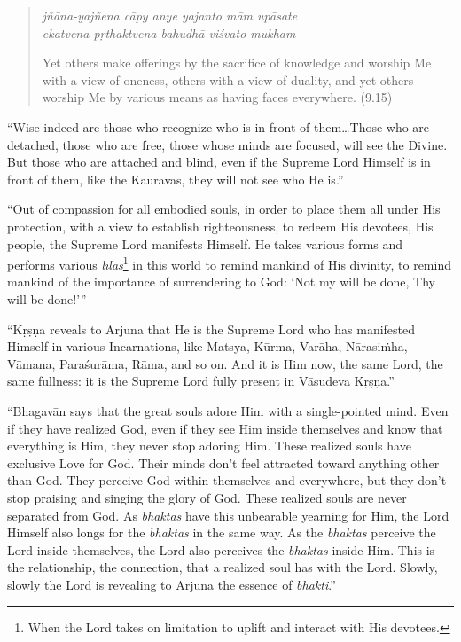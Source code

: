 \documentclass[12pt, twoside, openright]{memoir}
\begin{document}
\par
\begin{verse}
\textit{jñāna-yajñena cāpy anye yajanto mām upāsate} \\
\textit{ekatvena pṛthaktvena bahudhā viśvato-mukham}

\noindent Yet others make offerings by the sacrifice of knowledge and worship Me with a view of oneness, others with a view of duality, and yet others worship Me by various means as having faces everywhere. (9.15)
\end{verse}
\par


\enquote{Wise indeed are those who recognize who is in front of them\ldots Those who are detached, those who are free, those whose minds are focused, will see the Divine. But those who are attached and blind, even if the Supreme Lord Himself is in front of them, like the Kauravas, they will not see who He is.}

\enquote{Out of compassion for all embodied souls, in order to place them all under His protection, with a view to establish righteousness, to redeem His devotees, His people, the Supreme Lord manifests Himself. He takes various forms and performs various \textit{līlās}\footnote{When the Lord takes on limitation to uplift and interact with His devotees.} in this world to remind mankind of His divinity, to remind mankind of the importance of surrendering to God: \enquote{Not my will be done, Thy will be done!}}

\enquote{Kṛṣṇa reveals to Arjuna that He is the Supreme Lord who has manifested Himself in various Incarnations, like Matsya, Kūrma, Varāha, Nārasiṁha, Vāmana, Paraśurāma, Rāma, and so on. And it is Him now, the same Lord, the same fullness: it is the Supreme Lord fully present in Vāsudeva Kṛṣṇa.}

\enquote{Bhagavān says that the great souls adore Him with a single-pointed mind. Even if they have realized God, even if they see Him inside themselves and know that everything is Him, they never stop adoring Him. These realized souls have exclusive Love for God. Their minds don’t feel attracted toward anything other than God. They perceive God within themselves and everywhere, but they don’t stop praising and singing the glory of God. These realized souls are never separated from God. As \textit{bhaktas} have this unbearable yearning for Him, the Lord Himself also longs for the \textit{bhaktas} in the same way. As the \textit{bhaktas} perceive the Lord inside themselves, the Lord also perceives the \textit{bhaktas} inside Him. This is the relationship, the connection, that a realized soul has with the Lord. Slowly, slowly the Lord is revealing to Arjuna the essence of \textit{bhakti}.}
\end{document}
